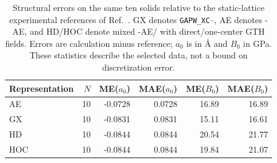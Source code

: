 \begin{table}[t]
\centering
\small
\caption{Structural errors on the same ten solids relative to the static-lattice experimental references of Ref.~. GX denotes \texttt{GAPW\_XC}--\GTH{}, AE denotes \GAPW{}-AE, and HD/HOC denote mixed \GAPW{}-AE/\GTH{} with direct/one-center GTH fields. Errors are calculation minus reference; $a_0$ is in \AA{} and $B_0$ in GPa. These statistics describe the selected data, not a bound on discretization error.}
\label{tab:goldzak12_plan}
\begin{tabular}{lrrrrr}
\toprule
Representation & $N$ & ME($a_0$) & MAE($a_0$) & ME($B_0$) & MAE($B_0$) \\
\midrule
AE & 10 & -0.0728 & 0.0728 & 16.89 & 16.89 \\
GX & 10 & -0.0831 & 0.0831 & 15.11 & 16.61 \\
HD & 10 & -0.0844 & 0.0844 & 20.54 & 21.77 \\
HOC & 10 & -0.0844 & 0.0844 & 19.84 & 21.07 \\
\bottomrule
\end{tabular}
\end{table}
